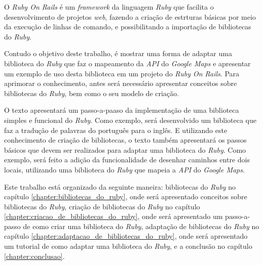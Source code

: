 O \emph{Ruby On Rails} é um \emph{framework} da linguagem \emph{Ruby} que facilita o
desenvolvimento de projetos \emph{web}, fazendo a criação de estrturas básicas por meio da
execução de linhas de comando, e possibilitando a importação de bibliotecas do \emph{Ruby}.

Contudo o objetivo deste trabalho, é mostrar uma forma de adaptar uma biblioteca do \emph{Ruby}
que faz o mapeamento da \emph{API} do \emph{Google Maps} e apresentar um exemplo de uso desta
biblioteca em um projeto do \emph{Ruby On Rails}. Para aprimorar o conhecimento, antes será
necessário apresentar conceitos sobre bibliotecas do \emph{Ruby}, bem como o seu modelo de
criação.

O texto apresentará um passo-a-paaso da implementação de uma biblioteca simples
e funcional do \emph{Ruby}. Como exemplo, será desenvolvido um biblioteca que faz a
tradução de palavras do português para o inglês. E utilizando este conhecimento de criação
de bibliotecas, o texto também apresentará os passos básicos que devem ser realizados
para adaptar uma biblioteca do \emph{Ruby}. Como exemplo, será feito a adição da
funcionalidade de desenhar caminhos entre dois locais, utilizando uma biblioteca do
\emph{Ruby} que mapeia a \emph{API} do \emph{Google Maps}. 

Este trabalho está organizado da seguinte maneira: bibliotecas do \emph{Ruby} no
capítulo \ref{chapter:bibliotecas_do_ruby}, onde será apresentado conceitos sobre
bibliotecas do \emph{Ruby}, criação de bibliotecas do \emph{Ruby} no capítulo 
\ref{chapter:criacao_de_bibliotecas_do_ruby}, onde será apresentado um passo-a-passo
de como criar uma biblioteca do \emph{Ruby}, adaptação de bibliotecas do \emph{Ruby}
no capítulo  \ref{chapter:adaptacao_de_bibliotecas_do_ruby}, onde será apresentado um
tutorial de como adaptar uma biblioteca do \emph{Ruby}, e a conclusão no capítulo
\ref{chapter:conclusao}.